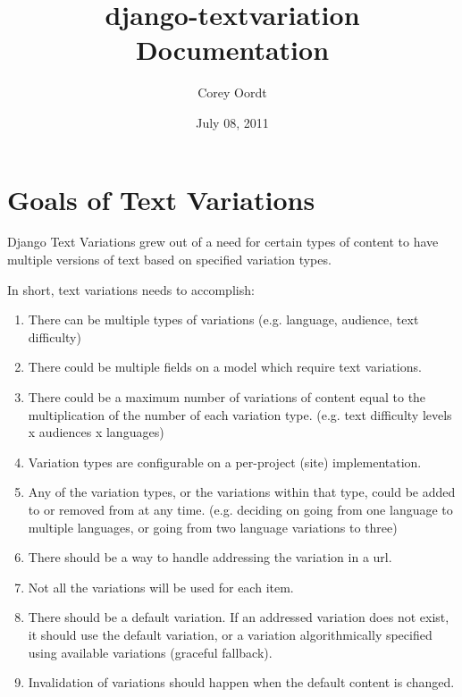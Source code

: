 \documentclass[letterpaper,10pt,english]{sphinxmanual}
\title{django-textvariation Documentation}
\date{July 08, 2011}
\author{Corey Oordt}
\begin{document}
\maketitle
\tableofcontents
{}\label{index::doc}



\chapter{Goals of Text Variations}
\label{goals:goals-of-text-variations}\label{goals::doc}\label{goals:contents}
Django Text Variations grew out of a need for certain types of content to have multiple versions of text based on specified variation types.

In short, text variations needs to accomplish:
\begin{enumerate}
\item {} 
There can be multiple types of variations (e.g. language, audience, text difficulty)

\item {} 
There could be multiple fields on a model which require text variations.

\item {} 
There could be a maximum number of variations of content equal to the multiplication of the number of each variation type. (e.g. text difficulty levels x audiences x languages)

\item {} 
Variation types are configurable on a per-project (site) implementation.

\item {} 
Any of the variation types, or the variations within that type, could be added to or removed from at any time. (e.g. deciding on going from one language to multiple languages, or going from two language variations to three)

\item {} 
There should be a way to handle addressing the variation in a url.

\item {} 
Not all the variations will be used for each item.

\item {} 
There should be a default variation. If an addressed variation does not exist, it should use the default variation, or a variation algorithmically specified using available variations (graceful fallback).

\item {} 
Invalidation of variations should happen when the default content is changed.

\end{enumerate}
\end{document}
